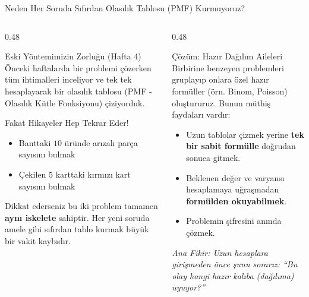 \documentclass[light]{lutbeamer}
\begin{document}
\begin{frame}{Neden Her Soruda Sıfırdan Olasılık Tablosu (PMF) Kurmuyoruz?}
    \small
    \begin{columns}[T]
        \begin{column}{0.48\textwidth}
            \begin{block}{Eski Yöntemimizin Zorluğu (Hafta 4)}
                Önceki haftalarda bir problemi çözerken tüm ihtimalleri inceliyor ve tek tek hesaplayarak bir olasılık tablosu (PMF - Olasılık Kütle Fonksiyonu) çiziyorduk. 
            \end{block}

            \begin{block}{Fakat Hikayeler Hep Tekrar Eder!}
                \begin{itemize}
                    \item Banttaki \(10\) üründe arızalı parça sayısını bulmak
                    \item Çekilen \(5\) karttaki kırmızı kart sayısını bulmak
                \end{itemize}
                Dikkat ederseniz bu iki problem tamamen \textbf{aynı iskelete} sahiptir. Her yeni soruda amele gibi sıfırdan tablo kurmak büyük bir vakit kaybıdır.
            \end{block}
        \end{column}
        \begin{column}{0.48\textwidth}
            \begin{exampleblock}{Çözüm: Hazır Dağılım Aileleri}
                Birbirine benzeyen problemleri gruplayıp onlara özel hazır formüller (örn. Binom, Poisson) oluştururuz. Bunun müthiş faydaları vardır:
                \begin{itemize}
                    \item Uzun tablolar çizmek yerine \textbf{tek bir sabit formülle} doğrudan sonuca gitmek.
                    \item Beklenen değer ve varyansı hesaplamaya uğraşmadan \textbf{formülden okuyabilmek}.
                    \item Problemin şifresini anında çözmek.
                \end{itemize}
            \end{exampleblock}

            \vspace{0.2cm}
            \centering
            \textit{Ana Fikir: Uzun hesaplara girişmeden önce şunu sorarız: ``Bu olay hangi hazır kalıba (dağılıma) uyuyor?''}
        \end{column}
    \end{columns}
\end{frame}
\end{document}
